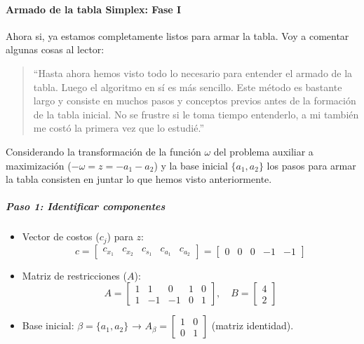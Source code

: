 \newpage

\paragraph{Armado de la tabla Simplex: Fase I}

Ahora si, ya estamos completamente listos para armar la tabla. Voy a comentar algunas cosas al lector:
\begin{quote}
  ``Hasta ahora hemos visto todo lo necesario para entender el armado de la tabla. Luego el algoritmo en sí es más sencillo. Este método es bastante largo y consiste en muchos pasos y conceptos previos antes de la formación de la tabla inicial. No se frustre si le toma tiempo entenderlo, a mi también me costó la primera vez que lo estudié.'' 
\end{quote}

Considerando la transformación de la función \(\omega\) del problema auxiliar a maximización (\(-\omega = z = -a_1 - a_2\)) y la base inicial \(\{a_1, a_2\}\) los pasos para armar la tabla consisten en juntar lo que hemos visto anteriormente.

\subparagraph{Paso 1: Identificar componentes}
\begin{itemize}
  \item Vector de costos (\(c_j\)) para \(z\):  
  \[
  c = \begin{bmatrix}
  c_{x_1} & c_{x_2} & c_{s_1} & c_{a_1} & c_{a_2}
  \end{bmatrix} = \begin{bmatrix}
  0 & 0 & 0 & -1 & -1
  \end{bmatrix}
  \]
  \item Matriz de restricciones (\(A\)):
  \[
  A = \begin{bmatrix}
  1 & 1 & 0 & 1 & 0 \\
  1 & -1 & -1 & 0 & 1
  \end{bmatrix}, \quad B = \begin{bmatrix} 4 \\ 2 \end{bmatrix}
  \]
  \item Base inicial: \(\beta = \{a_1, a_2\}\) → \(A_\beta = \begin{bmatrix} 1 & 0 \\ 0 & 1 \end{bmatrix}\) (matriz identidad).
\end{itemize}

